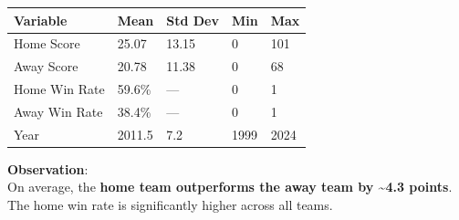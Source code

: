 \documentclass[
  letterpaper,
  DIV=11,
  numbers=noendperiod]{scrartcl}
\begin{document}
\begin{longtable}[]{@{}lllll@{}}
\toprule\noalign{}
Variable & Mean & Std Dev & Min & Max \\
\midrule\noalign{}
\endhead
\bottomrule\noalign{}
\endlastfoot
Home Score & 25.07 & 13.15 & 0 & 101 \\
Away Score & 20.78 & 11.38 & 0 & 68 \\
Home Win Rate & 59.6\% & --- & 0 & 1 \\
Away Win Rate & 38.4\% & --- & 0 & 1 \\
Year & 2011.5 & 7.2 & 1999 & 2024 \\
\end{longtable}

\textbf{Observation}:\\
On average, the \textbf{home team outperforms the away team by
\textasciitilde4.3 points}. The home win rate is significantly higher
across all teams.
\end{document}
